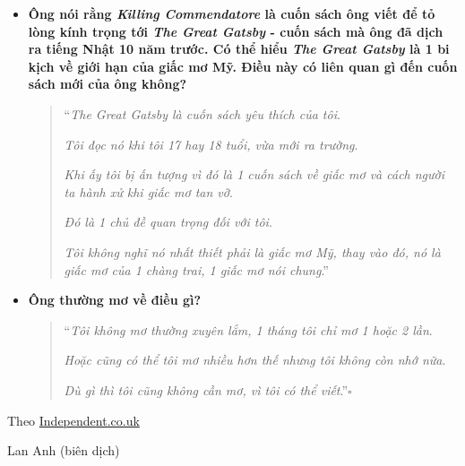 \documentclass{book}
\numberwithin{equation}{section}
\begin{document}
\begin{itemize}
\begin{quotation}
        \textit{Bạn không thể giải thích hay phân tích các ẩn dụ được - bạn chỉ cần chấp nhận nó thôi}.
        
        \textit{1 cuốn sách cũng thế - tự nó cũng là 1 ẩn dụ}.''
    \end{quotation}
    
    \item \textbf{Ông nói rằng \textit{Killing Commendatore} là cuốn sách ông viết để tỏ lòng kính trọng tới \textit{The Great Gatsby} - cuốn sách mà ông đã dịch ra tiếng Nhật 10 năm trước. Có thể hiểu \textit{The Great Gatsby} là 1 bi kịch về giới hạn của giấc mơ Mỹ. Điều này có liên quan gì đến cuốn sách mới của ông không?}
    
    \begin{quotation}
        ``\textit{The Great Gatsby là cuốn sách yêu thích của tôi}.
        
        \textit{Tôi đọc nó khi tôi 17 hay 18 tuổi, vừa mới ra trường}.
        
        \textit{Khi ấy tôi bị ấn tượng vì đó là 1 cuốn sách về giấc mơ và cách người ta hành xử khi giấc mơ tan vỡ}.
        
        \textit{Đó là 1 chủ đề quan trọng đối với tôi}.
        
        \textit{Tôi không nghĩ nó nhất thiết phải là giấc mơ Mỹ, thay vào đó, nó là giấc mơ của 1 chàng trai, 1 giấc mơ nói chung}.''
    \end{quotation}
    
    \item \textbf{Ông thường mơ về điều gì?}
    
    \begin{quotation}
        ``\textit{Tôi không mơ thường xuyên lắm, 1 tháng tôi chỉ mơ 1 hoặc 2 lần}.
        
        \textit{Hoặc cũng có thể tôi mơ nhiều hơn thế nhưng tôi không còn nhớ nữa}.
        
        \textit{Dù gì thì tôi cũng không cần mơ, vì tôi có thể viết}.''\hfill$\square$
    \end{quotation}    
\end{itemize}

\begin{flushright}
    Theo \href{https://www.independent.co.uk/arts-entertainment/books/features/haruki-murakami-interview-killing-commendatore-novel-new-a8578696.html}{Independent.co.uk}
    
    Lan Anh (biên dịch)
\end{flushright}
\end{document}
